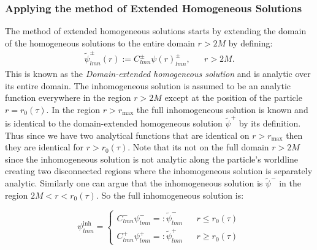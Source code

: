 \documentclass[preprint,showpacs,preprintnumbers,amssymb,superscriptaddress,aps,prd,nofootinbib,11pt]{revtex4-1}
\begin{document}
 \subsubsection{Applying the method of Extended Homogeneous Solutions}

The method of extended homogeneous solutions starts by extending the domain of the homogeneous solutions to the entire domain $r>2M$ by defining:
\begin{equation}
    \begin{aligned}
    \tilde{\psi}^\pm_{lmn} (r)  := C^\pm_{lmn} \psi(r)^\pm_{lmn},  && r>2M.
    \end{aligned}
\end{equation}
This is known as the \textit{Domain-extended homogeneous solution} and is analytic over its entire domain. The inhomogeneous solution is assumed to be an analytic function everywhere in the region $r>2M$ except at the position of the particle $r=r_0(\tau)$. In the region $r>r_\text{max}$ the full inhomogeneous solution is known and is identical to the domain-extended homogeneous solution $\tilde{\psi}^+$ by its definition. Thus since we have two analytical functions that are identical on $r>r_\text{max}$ then they are identical for $r>r_0(\tau)$. Note that its not on the full domain $r>2M$ since the inhomogeneous solution is not analytic along the particle's worldline creating two disconnected regions where the inhomogeneous solution is separately analytic. Similarly one can argue that the inhomogeneous solution is $\tilde{\psi}^-$ in the region $2M<r<r_0(\tau)$. So the full inhomogeneous solution is:

\begin{equation}
    \psi^\text{inh}_{lmn} = \left\{ 
    \begin{aligned}
         C^-_{lmn} \psi^-_{lmn} =: \tilde{\psi}^-_{lmn} && r\leq r_0(\tau)\\
         C^+_{lmn} \psi^+_{lmn} =: \tilde{\psi}^+_{lmn} && r\geq r_0(\tau)
    \end{aligned}
    \right.
\end{equation}
\end{document}
